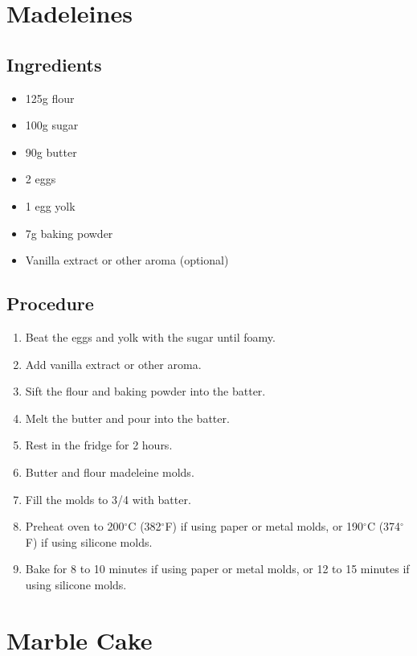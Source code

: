 \documentclass[10pt]{book}
\newcommand{\degree}{$^\circ$}
\begin{document}

\newpage
\section*{Madeleines}
\subsection*{Ingredients}
	\begin{itemize}
		\item 125g flour
		\item 100g sugar
		\item 90g butter
		\item 2 eggs
		\item 1 egg yolk
		\item 7g baking powder
		\item Vanilla extract or other aroma (optional)
	\end{itemize}
\subsection*{Procedure}
	\begin{enumerate}
		\item Beat the eggs and yolk with the sugar until foamy.
		\item Add vanilla extract or other aroma.
		\item Sift the flour and baking powder into the batter.
		\item Melt the butter and pour into the batter.
		\item Rest in the fridge for 2 hours.
		\item Butter and flour madeleine molds.
		\item Fill the molds to 3/4 with batter.
		\item Preheat oven to 200{\degree}C (382{\degree}F) if using paper or metal molds, or 190{\degree}C (374{\degree}F) if using silicone molds.
		\item Bake for 8 to 10 minutes if using paper or metal molds, or 12 to 15 minutes if using silicone molds.
	\end{enumerate}
\newpage


\newpage
\section*{Marble Cake}
\end{document}
